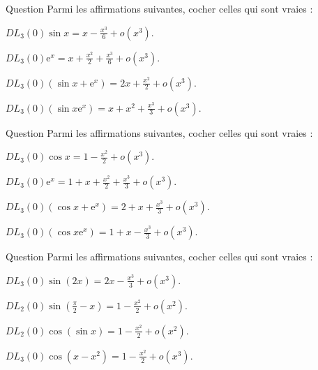 \begin{multi}[multiple,feedback=
{On a : \(\displaystyle \sin x=x-\frac{x^3}{6}+o(x^3)\) et \(\displaystyle \mathrm{e}^{x}=1+x+\frac{x^2}{2}+\frac{x^3}{6}+o(x^3)\). Donc
\[DL_3(0)\left(\mathrm{e}^{x}+\sin x\right)=1+2x+\frac{x^2}{2}+o(x^3)\quad\mbox{et}\quad DL_3(0)\left(\sin x\mathrm{e}^{x}\right)=x+x^2+\frac{x^3}{3}+o(x^3).\]
}]{Question}
Parmi les affirmations suivantes, cocher celles qui sont vraies :

    \item* \(\displaystyle DL_3(0)\sin x=x-\frac{x^3}{6}+o(x^3)\).
    \item \(\displaystyle DL_3(0)\mathrm{e}^{x}=x+\frac{x^2}{2}+\frac{x^3}{6}+o(x^3)\).
    \item \(\displaystyle DL_3(0)\left(\sin x+\mathrm{e}^{x}\right)=2x+\frac{x^2}{2}+o(x^3)\).
    \item* \(\displaystyle DL_3(0)\left(\sin x\mathrm{e}^{x}\right)=x+x^2+\frac{x^3}{3}+o(x^3)\).
\end{multi}


\begin{multi}[multiple,feedback=
{On a : \(\displaystyle DL_3(0)\cos x=1-\frac{x^2}{2}+o(x^3)\) et \(\displaystyle DL_3(0)\mathrm{e}^x=1+x+\frac{x^2}{2}+\frac{x^3}{6}+o(x^3)\). Donc \(\displaystyle DL_3(0)\left(\cos x+\mathrm{e}^x\right)=2+x+\frac{x^3}{6}+o(x^3)\) et \(\displaystyle DL_3(0)\cos x\mathrm{e}^x=1+x-\frac{x^3}{3}+o(x^3)\).
}]{Question}
Parmi les affirmations suivantes, cocher celles qui sont vraies :

    \item* \(\displaystyle DL_3(0)\cos x=1-\frac{x^2}{2}+o(x^3)\).
    \item \(\displaystyle DL_3(0)\mathrm{e}^x=1+x+\frac{x^2}{2}+\frac{x^3}{3}+o(x^3)\).
    \item \(\displaystyle DL_3(0)\left(\cos x+\mathrm{e}^x\right)=2+x+\frac{x^3}{3}+o(x^3)\).
    \item* \(\displaystyle DL_3(0)\left(\cos x\mathrm{e}^{x}\right)=1+x-\frac{x^3}{3}+o(x^3)\).
\end{multi}


\begin{multi}[multiple,feedback=
{Le \(DL_3(0)\sin(t)\), avec \(t=2x\), donne : \(\displaystyle DL_3(0)\sin (2x)=2x-\frac{4x^3}{3}+o(x^3)\). Ensuite \(\displaystyle \sin \left(\frac{\pi}{2}-x\right)=\cos (x)=1-\frac{x^2}{2}+o(x^2)\). Enfin, en posant \(t=\sin x\) et puis \(t=x-x^2\) dans le \(DL_3(0)\cos (t)\), on obtient :
\[\displaystyle DL_2(0)\cos (\sin x)=1-\frac{x^2}{2}+o(x^2)\; \mbox{ et }\; DL_3(0)\cos (x-x^2)=1-\frac{x^2}{2}+x^3+o(x^3).\]
}]{Question}
Parmi les affirmations suivantes, cocher celles qui sont vraies :

    \item \(\displaystyle DL_3(0)\sin (2x)=2x-\frac{x^3}{3}+o(x^3)\).
    \item* \(\displaystyle DL_2(0)\sin \left(\frac{\pi}{2}-x\right)=1-\frac{x^2}{2}+o(x^2)\).
    \item* \(\displaystyle DL_2(0)\cos (\sin x)=1-\frac{x^2}{2}+o(x^2)\).
    \item \(\displaystyle DL_3(0)\cos (x-x^2)=1-\frac{x^2}{2}+o(x^3)\).
\end{multi}


